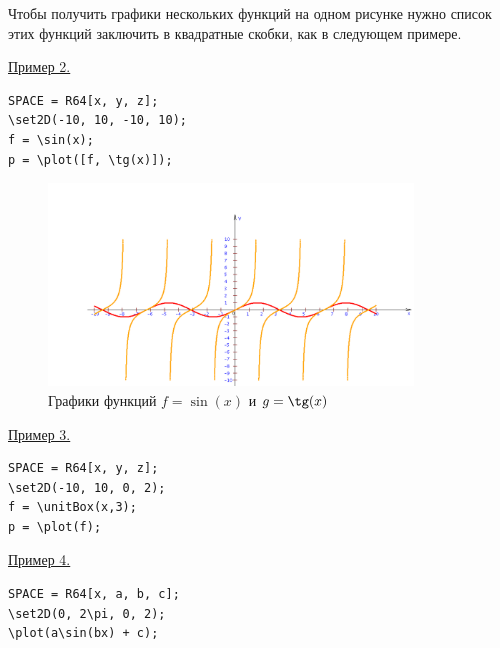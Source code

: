 \eject

Чтобы получить графики нескольких функций на одном рисунке нужно список
этих функций заключить в квадратные скобки, как в следующем примере.

\underline{Пример 2. }


\begin{verbatim}
SPACE = R64[x, y, z];
\set2D(-10, 10, -10, 10);
f = \sin(x); 
p = \plot([f, \tg(x)]);
\end{verbatim}


\begin{figure}[!h]
  \includegraphics[width=274.6pt,height=152.38pt]{pictures/3_3}
  \caption{Графики функций $f = \sin(x)$ и $g = \tg(x)$}
  \label{3_3}
\end{figure}

\underline{Пример 3. }


\begin{verbatim}
SPACE = R64[x, y, z];
\set2D(-10, 10, 0, 2);
f = \unitBox(x,3); 
p = \plot(f);
\end{verbatim}



\underline{Пример 4. }


\begin{verbatim}
SPACE = R64[x, a, b, c];
\set2D(0, 2\pi, 0, 2);
\plot(a\sin(bx) + c);
\end{verbatim}


